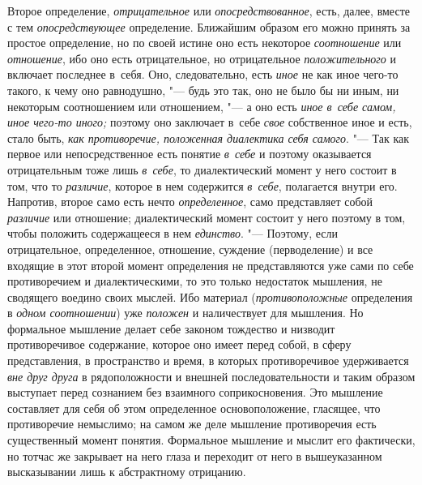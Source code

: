 Второе определение, {\em отрицательное} или
{\em опосредствованное}, есть, далее, вместе с тем {\em опосредствующее}
определение. Ближайшим образом его можно принять за простое
определение, но по своей истине оно есть некоторое
{\em соотношение} или {\em отношение}, ибо оно
есть отрицательное, но отрицательное {\em положительного} и
включает последнее в~себя. Оно, следовательно, есть {\em иное} не как
иное чего-то такого, к чему оно равнодушно, "--- будь это
так, оно не было бы ни иным, ни некоторым соотношением или отношением, "---
а оно есть {\em иное в~себе самом, иное чего-то иного;}
поэтому оно заключает в~себе
{\em свое} собственное иное и есть, стало быть, {\em как
противоречие, положенная диалектика себя самого}. "--- Так как
первое или непосредственное есть понятие {\em в~себе} и поэтому
оказывается отрицательным тоже лишь {\em в~себе}, то
диалектический момент у него состоит в том, что то
{\em различие}, которое в нем содержится {\em в~себе},
полагается внутри его. Напротив, второе само есть нечто
{\em определенное}, само представляет собой {\em различие}
или отношение; диалектический момент состоит у него поэтому в
том, чтобы положить содержащееся в нем {\em единство}. "---
Поэтому, если отрицательное, определенное, отношение,
суждение (перводеление) и все входящие в этот второй момент определения не
представляются уже сами по себе противоречием и диалектическими, то это
только недостаток мышления, не сводящего воедино своих мыслей. Ибо материал
({\em противоположные} определения в {\em одном соотношении}) уже
{\em положен} и наличествует для мышления. Но формальное мышление делает
себе законом тождество и низводит противоречивое содержание,
которое оно имеет перед собой, в сферу представления, в пространство и
время, в которых противоречивое удерживается {\em вне друг друга} в
рядоположности и внешней последовательности и таким образом выступает перед
сознанием без взаимного соприкосновения. Это мышление составляет для себя
об этом определенное основоположение, гласящее, что противоречие немыслимо;
на самом же деле мышление противоречия есть существенный момент понятия.
Формальное мышление и мыслит его фактически, но тотчас же закрывает на него
глаза и переходит от него в вышеуказанном высказывании лишь к абстрактному
отрицанию.

